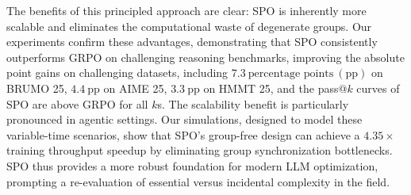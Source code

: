 The benefits of this principled approach are clear: SPO is inherently more scalable and eliminates the computational waste of degenerate groups. Our experiments confirm these advantages, demonstrating that SPO consistently outperforms GRPO on challenging reasoning benchmarks, improving the absolute point gains on challenging
datasets, including $7.3~\text{percentage points}~(\mathrm{pp})$ on BRUMO 25, $4.4~\mathrm{pp}$ on AIME 25, $3.3~\mathrm{pp}$ on HMMT 25, and the pass@$k$ curves of SPO are above GRPO for all $k$s. The scalability benefit is particularly pronounced in agentic settings. Our simulations, designed to model these variable-time scenarios, show that SPO's group-free design can achieve a $4.35\times$ training throughput speedup by eliminating group synchronization bottlenecks. SPO thus provides a more robust foundation for modern LLM optimization, prompting a re-evaluation of essential versus incidental complexity in the field.
